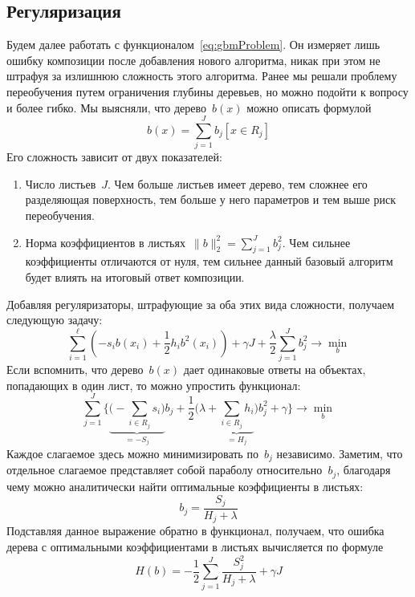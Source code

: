 \documentclass[12pt,fleqn]{article}
\begin{document}
\subsection{Регуляризация}
Будем далее работать с функционалом~\eqref{eq:gbmProblem}.
Он измеряет лишь ошибку композиции после добавления нового алгоритма,
никак при этом не штрафуя за излишнюю сложность этого алгоритма.
Ранее мы решали проблему переобучения путем ограничения глубины деревьев,
но можно подойти к вопросу и более гибко.
Мы выясняли, что дерево~$b(x)$ можно описать формулой
\[
    b(x)
    =
    \sum_{j = 1}^{J}
        b_{j}
        [x \in R_{j}]
\]
Его сложность зависит от двух показателей:
\begin{enumerate}
    \item Число листьев~$J$. Чем больше листьев имеет дерево, тем сложнее его разделяющая поверхность,
        тем больше у него параметров и тем выше риск переобучения.
    \item Норма коэффициентов в листьях~$\|b\|_2^2 = \sum_{j = 1}^{J} b_j^2$.
        Чем сильнее коэффициенты отличаются от нуля, тем сильнее данный
        базовый алгоритм будет влиять на итоговый ответ композиции.
\end{enumerate}
Добавляя регуляризаторы, штрафующие за оба этих вида сложности, получаем следующую задачу:
\[
    \sum_{i = 1}^{\ell} \left(
        -
        s_i b(x_i)
        +
        \frac12
        h_i b^2(x_i)
    \right)
    +
    \gamma J
    +
    \frac{\lambda}{2}
    \sum_{j = 1}^{J}
        b_j^2
    \to
    \min_{b}
\]
Если вспомнить, что дерево~$b(x)$ дает одинаковые ответы на объектах,
попадающих в один лист, то можно упростить функционал:
\[
    \sum_{j = 1}^{J} \Biggl\{
        \underbrace{
        \Biggl(
            -
            \sum_{i \in R_j} s_i
        \Biggr)
        }_{=-S_j}
        b_j
        +
        \frac12
        \Biggl(
            \lambda
            +
            \underbrace{
            \sum_{i \in R_j} h_i
            }_{=H_j}
        \Biggr)
        b_j^2
        +
        \gamma
    \Biggr\}
    \to
    \min_{b}
\]
Каждое слагаемое здесь можно минимизировать по~$b_j$ независимо.
Заметим, что отдельное слагаемое представляет собой параболу относительно~$b_j$,
благодаря чему можно аналитически найти оптимальные коэффициенты в листьях:
\[
    b_j
    =
    \frac{S_j}{H_j + \lambda}
\]
Подставляя данное выражение обратно в функционал, получаем,
что ошибка дерева с оптимальными коэффициентами в листьях вычисляется по формуле
\begin{equation}
\label{eq:impurity}
    H(b)
    =
    -
    \frac12
    \sum_{j = 1}^{J}
        \frac{
            S_j^2
        }{
            H_j + \lambda
        }
    +
    \gamma J
\end{equation}
\end{document}
